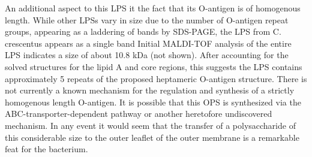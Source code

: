	An additional aspect to this \ac{LPS} it the fact that its O-antigen is of homogenous length. While other \ac{LPS}s vary in size due to the number of O-antigen repeat groups, appearing as a laddering of bands by \ac{SDS-PAGE}, the \ac{LPS} from C. crescentus appears as a single band Initial \ac{MALDI-TOF} analysis of the entire \ac{LPS} indicates a size of about 10.8 kDa (not shown).  %
	After accounting for the solved structures for the lipid A and core regions, this suggests the \ac{LPS} contains approximately 5 repeats of the proposed heptameric O-antigen structure.  There is not currently a known mechanism for the regulation and synthesis of a strictly homogenous length O-antigen. It is possible that this \ac{OPS} is synthesized via the \ac{ABC}-transporter-dependent pathway or another heretofore undiscovered mechanism. In any event it would seem that the transfer of a polysaccharide of this considerable size to the outer leaflet of the outer membrane is a remarkable feat for the bacterium.
 
